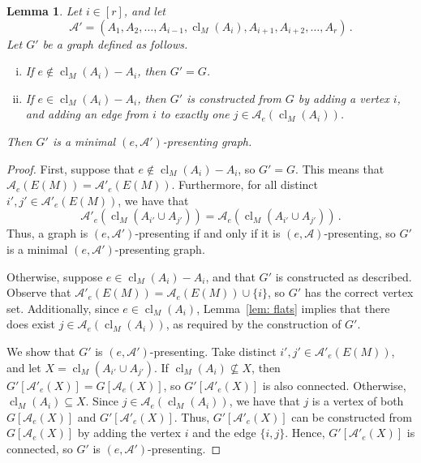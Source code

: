 \documentclass[11pt, reqno]{amsart}
\newtheorem{lemma}[theorem]{Lemma}
\DeclareMathOperator{\cl}{cl}
\begin{document}
\begin{lemma} \label{lem: extend presentation}
Let $i \in [r]$, and let
$$
\mathcal A' = (A_1, A_2, \ldots, A_{i-1}, \cl_M(A_i), A_{i+1}, A_{i+2}, \ldots, A_r) \,.
$$
Let $G'$ be a graph defined as follows.
\begin{enumerate} [(i)]
\item If $e \notin \cl_M(A_i) - A_i$, then $G' = G$.
\item If $e \in \cl_M(A_i) - A_i$, then $G'$ is constructed from $G$ by adding a vertex $i$, and adding an edge from $i$ to exactly one $j \in \mathcal A_e(\cl_M(A_i))$.
\end{enumerate}
Then $G'$ is a minimal $(e, \mathcal A')$-presenting graph.
\end{lemma}

\begin{proof}
First, suppose that $e \notin \cl_M(A_i) - A_i$, so $G' = G$. This means that $\mathcal A_e(E(M)) = \mathcal A'_e(E(M))$. Furthermore, for all distinct $i', j' \in \mathcal A'_e(E(M))$, we have that 
$$
\mathcal A'_e(\cl_M(A_{i'} \cup A_{j'})) = \mathcal A_e(\cl_M(A_{i'} \cup A_{j'})) \,.
$$ 
Thus, a graph is $(e, \mathcal A')$-presenting if and only if it is $(e, \mathcal A)$-presenting, so $G'$ is a minimal $(e, \mathcal A')$-presenting graph.

Otherwise, suppose $e \in \cl_M(A_i) - A_i$, and that $G'$ is constructed as described. Observe that $\mathcal A'_e(E(M)) = \mathcal A_e(E(M)) \cup \{i\}$, so $G'$ has the correct vertex set. Additionally, since $e \in \cl_M(A_i)$, Lemma~\ref{lem: flats} implies that there does exist $j \in \mathcal A_e(\cl_M(A_i))$, as required by the construction of $G'$.
	
We show that $G'$ is $(e, \mathcal A')$-presenting. Take distinct $i', j' \in \mathcal A'_e(E(M))$, and let $X = \cl_{M}(A_{i'} \cup A_{j'})$. If $\cl_M(A_i) \not\subseteq X$, then $G'[\mathcal A'_e(X)] = G[\mathcal A_e(X)]$, so $G'[\mathcal A'_e(X)]$ is also connected. Otherwise, $\cl_M(A_i) \subseteq X$. Since $j \in \mathcal A_e(\cl_M(A_i))$, we have that $j$ is a vertex of both $G[\mathcal A_e(X)]$ and $G'[\mathcal A'_e(X)]$. Thus, $G'[\mathcal A'_e(X)]$ can be constructed from $G[\mathcal A_e(X)]$ by adding the vertex $i$ and the edge $\{i,j\}$. Hence, $G'[\mathcal A'_e(X)]$ is connected, so $G'$ is $(e, \mathcal A')$-presenting.


\end{proof}
\end{document}
